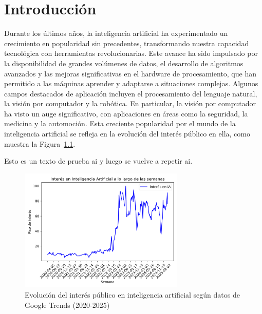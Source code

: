 \documentclass[11pt,spanish,listoffigures,listoftables]{tfgetsinf}
\begin{document}

\mainmatter


\chapter{Introducci\'on}
Durante los últimos años, la inteligencia artificial ha experimentado un crecimiento en popularidad sin precedentes, transformando nuestra capacidad tecnológica con herramientas revolucionarias. Este avance ha sido impulsado por la disponibilidad de grandes volúmenes de datos, el desarrollo de algoritmos avanzados y las mejoras significativas en el hardware de procesamiento, que han permitido a las máquinas aprender y adaptarse a situaciones complejas. Algunos campos destacados de aplicación incluyen el procesamiento del lenguaje natural, la visión por computador y la robótica. En particular, la visión por computador ha visto un auge significativo, con aplicaciones en áreas como la seguridad, la medicina y la automoción. Esta creciente popularidad por el mundo de la inteligencia artificial se refleja en la evolución del interés público en ella, como muestra la Figura~\ref{fig:interes_en_inteligencia_artificial}.

Esto es un texto de prueba \gls{ai} y luego se vuelve a repetir \gls{ai}.


\begin{figure}[H]
   \centering
   \includegraphics[width=0.7\textwidth]{excels/introduccion/interes_en_ia.png}
   \caption{Evolución del interés público en inteligencia artificial según datos de Google Trends (2020-2025)}
\label{fig:interes_en_inteligencia_artificial}
\end{figure}
\end{document}
